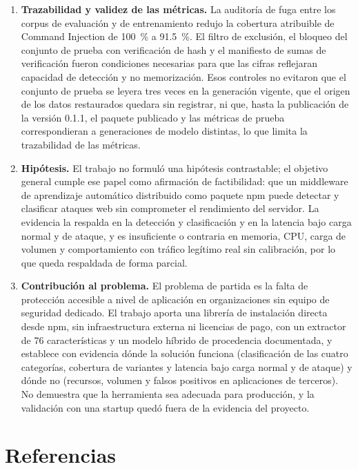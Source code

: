 \begin{enumerate}
    \item \textbf{Trazabilidad y validez de las métricas.}\label{conc:trazabilidad} La auditoría de fuga entre los corpus de
    evaluación y de entrenamiento redujo la cobertura atribuible de Command Injection de 100~\% a
    91.5~\%. El filtro de exclusión, el bloqueo del conjunto de prueba con verificación de hash y el
    manifiesto de sumas de verificación fueron condiciones necesarias para que las cifras reflejaran
    capacidad de detección y no memorización. Esos controles no evitaron que el conjunto de prueba
    se leyera tres veces en la generación vigente, que el origen de los datos restaurados quedara
    sin registrar, ni que, hasta la publicación de la versión 0.1.1, el paquete publicado y las
    métricas de prueba correspondieran a generaciones de modelo distintas, lo que limita la
    trazabilidad de las métricas.

    \item \textbf{Hipótesis.} El trabajo no formuló una hipótesis contrastable; el objetivo general
    cumple ese papel como afirmación de factibilidad: que un middleware de aprendizaje automático
    distribuido como paquete npm puede detectar y clasificar ataques web sin comprometer el
    rendimiento del servidor. La evidencia la respalda en la detección y clasificación y en la
    latencia bajo carga normal y de ataque, y es insuficiente o contraria en memoria, CPU, carga de
    volumen y comportamiento con tráfico legítimo real sin calibración, por lo que queda respaldada
    de forma parcial.

    \item \textbf{Contribución al problema.} El problema de partida es la falta de protección
    accesible a nivel de aplicación en organizaciones sin equipo de seguridad dedicado. El trabajo
    aporta una librería de instalación directa desde npm, sin infraestructura externa ni licencias
    de pago, con un extractor de 76 características y un modelo híbrido de procedencia documentada,
    y establece con evidencia dónde la solución funciona (clasificación de las cuatro categorías,
    cobertura de variantes y latencia bajo carga normal y de ataque) y dónde no (recursos, volumen y
    falsos positivos en aplicaciones de terceros). No demuestra que la herramienta sea adecuada para
    producción, y la validación con una startup quedó fuera de la evidencia del proyecto.
\end{enumerate}

\ifdefined\modoensamble
\else
	\section*{Referencias}
	\printbibliography[heading=none]
	
\fi
